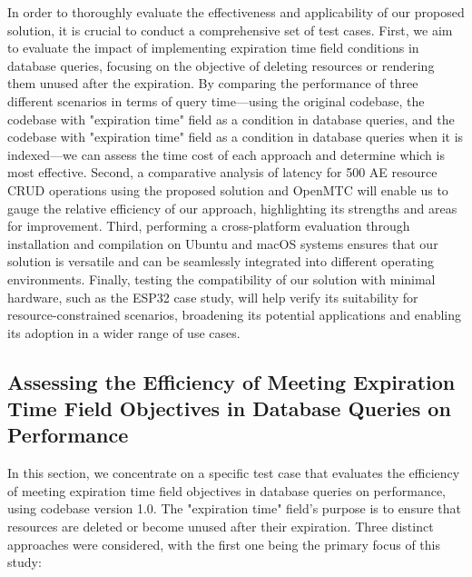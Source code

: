 \documentclass[a4paper,fleqn]{cas-dc}
\begin{document}
In order to thoroughly evaluate the effectiveness and applicability of our proposed solution, it is crucial to conduct a comprehensive set of test cases. First, we aim to evaluate the impact of implementing expiration time field conditions in database queries, focusing on the objective of deleting resources or rendering them unused after the expiration. By comparing the performance of three different scenarios in terms of query time—using the original codebase, the codebase with "expiration time" field as a condition in database queries, and the codebase with "expiration time" field as a condition in database queries when it is indexed—we can assess the time cost of each approach and determine which is most effective. Second, a comparative analysis of latency for 500 AE resource CRUD operations using the proposed solution and OpenMTC will enable us to gauge the relative efficiency of our approach, highlighting its strengths and areas for improvement. Third, performing a cross-platform evaluation through installation and compilation on Ubuntu and macOS systems ensures that our solution is versatile and can be seamlessly integrated into different operating environments. Finally, testing the compatibility of our solution with minimal hardware, such as the ESP32 case study, will help verify its suitability for resource-constrained scenarios, broadening its potential applications and enabling its adoption in a wider range of use cases.

\subsection{Assessing the Efficiency of Meeting Expiration Time Field Objectives in Database Queries on Performance}

In this section, we concentrate on a specific test case that evaluates the efficiency of meeting expiration time field objectives in database queries on performance, using codebase version 1.0. The "expiration time" field's purpose is to ensure that resources are deleted or become unused after their expiration. Three distinct approaches were considered, with the first one being the primary focus of this study:
\end{document}
